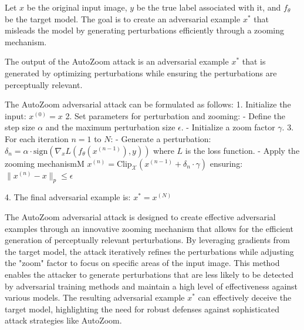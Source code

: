 Let $x$ be the original input image, $y$ be the true label associated with it, and $f_{\theta}$ be the target model. The goal is to create an adversarial example $x^*$ that misleads the model by generating perturbations efficiently through a zooming mechanism.

The output of the AutoZoom attack is an adversarial example $x^*$ that is generated by optimizing perturbations while ensuring the perturbations are perceptually relevant.

The AutoZoom adversarial attack can be formulated as follows:
1. Initialize the input:
   $x^{(0)} = x$
2. Set parameters for perturbation and zooming:
   - Define the step size $\alpha$ and the maximum perturbation size $\epsilon$.
   - Initialize a zoom factor $\gamma$.
3. For each iteration $n = 1$ to $N$:
   - Generate a perturbation:
   $\delta_n = \alpha \cdot \text{sign}(\nabla_x L(f_{\theta}(x^{(n-1)}), y))$
   where $L$ is the loss function.
   - Apply the zooming mechanismM
   $x^{(n)} = \text{Clip}_{\mathcal{X}}(x^{(n-1)} + \delta_n \cdot \gamma)$
   ensuring:
   $\|x^{(n)} - x\|_p \leq \epsilon$

4. The final adversarial example is:
   $x^* = x^{(N)}$

The AutoZoom adversarial attack is designed to create effective adversarial examples through an innovative zooming mechanism that allows for the efficient generation of perceptually relevant perturbations. By leveraging gradients from the target model, the attack iteratively refines the perturbations while adjusting the "zoom" factor to focus on specific areas of the input image. This method enables the attacker to generate perturbations that are less likely to be detected by adversarial training methods and maintain a high level of effectiveness against various models. The resulting adversarial example $x^*$ can effectively deceive the target model, highlighting the need for robust defenses against sophisticated attack strategies like AutoZoom.
